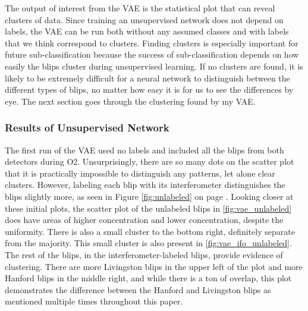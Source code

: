 \documentclass[a4paper]{article}
\begin{document}
The output of interest from the VAE is the statistical plot that can reveal clusters of data. Since training an unsupervised network does not depend on labels, the VAE can be run both without any assumed classes and with labels that we think correspond to clusters. Finding clusters is especially important for future sub-classification because the success of sub-classification depends on how easily the blips cluster during unsupervised learning. If no clusters are found, it is likely to be extremely difficult for a neural network to distinguish between the different types of blips, no matter how easy it is for us to see the differences by eye. The next section goes through the clustering found by my VAE.

\subsubsection{Results of Unsupervised Network}

The first run of the VAE used no labels and included all the blips from both detectors during O2. Unsurprisingly, there are so many dots on the scatter plot that it is practically impossible to distinguish any patterns, let alone clear clusters. However, labeling each blip with its interferometer distinguishes the blips slightly more, as seen in Figure \ref{fig:unlabeled} on page \pageref{fig:unlabeled}. Looking closer at these initial plots, the scatter plot of the unlabeled blips in \ref{fig:vae_unlabeled} does have areas of higher concentration and lower concentration, despite the uniformity. There is also a small cluster to the bottom right, definitely separate from the majority. This small cluster is also present in \ref{fig:vae_ifo_unlabeled}. The rest of the blips, in the interferometer-labeled blips, provide evidence of clustering. There are more Livingston blips in the upper left of the plot and more Hanford blips in the middle right, and while there is a ton of overlap, this plot demonstrates the difference between the Hanford and Livingston blips as mentioned multiple times throughout this paper.
\end{document}
